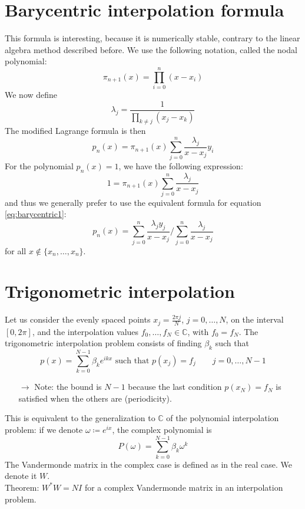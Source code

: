 \documentclass[12pt, openany]{report}
\theoremstyle{definition}
\begin{document}
\section{Barycentric interpolation formula}
This formula is interesting, because it is numerically stable, contrary to the linear algebra method described before. We use the following notation, called the nodal polynomial:
\begin{equation}
    \pi_{n+1}(x) = \prod_{i=0}^n (x-x_i)
\end{equation}
We now define 
\begin{equation}
    \lambda_j = \frac{1}{\prod_{k\neq j}(x_j-x_k)}
\end{equation}
The modified Lagrange formula is then 
\begin{equation}\label{eq:barycentric1}
    p_n(x) = \pi_{n+1}(x) \sum_{j=0}^n \frac{\lambda_j}{x-x_j}y_i
\end{equation}
For the polynomial \(p_n(x) = 1\), we have the following expression:\[1 = \pi_{n+1}(x) \sum_{j=0}^n \frac{\lambda_j}{x-x_j}\] and thus we generally prefer to use the equivalent formula for equation \eqref{eq:barycentric1}:
\begin{equation}\label{eq:barycentric2}
    p_n(x) = \sum_{j=0}^n \frac{\lambda_jy_j}{x-x_j} / \sum_{j=0}^n \frac{\lambda_j}{x-x_j}
\end{equation}
for all \(x\notin \{x_n,\dots,x_n\}\).
\section{Trigonometric interpolation}
Let us consider the evenly spaced points \(x_j = \frac{2\pi j}{N}\), \(j=0,\dots,N\), on the interval \([0,2\pi]\), and the interpolation values \(f_0,\dots, f_N\in \mathbb{C}\), with \(f_0=f_N\). The trigonometric interpolation problem consists of finding \(\beta_k\) such that 
\begin{equation}
    p(x) = \sum_{k=0}^{N-1}\beta_ke^{ikx}\text{ such that } p(x_j) = f_j\qquad j=0,\dots,N-1
\end{equation}
\begin{itemize}
    \item [\(\rightarrow\)] Note: the bound is \(N-1\) because the last condition \(p(x_N) = f_N\) is satisfied when the others are (periodicity). 
\end{itemize}
This is equivalent to the generalization to \(\mathbb{C}\) of the polynomial interpolation problem: if we denote \(\omega \coloneqq e^{ix}\), the complex polynomial is 
\begin{equation}
    P(\omega) = \sum_{k=0}^{N-1} \beta_k \omega^k
\end{equation}
The Vandermonde matrix in the complex case is defined as in the real case. We denote it \(W\). \\
Theorem: \(W^*W=NI\) for a complex Vandermonde matrix in an interpolation problem. \\
\end{document}
